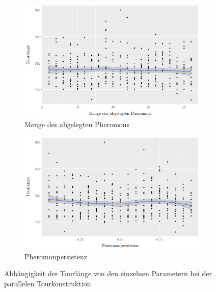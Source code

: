 \documentclass[doktyp=barbeit, sprache=german]{TUBAFarbeiten}
\begin{document}
\begin{figure}
\begin{subfigure}[b]{0.475\textwidth}
            \includegraphics[width=\textwidth]{images/diagramparalleldeposit}
            \caption{Menge des abgelegten Pheromons}   
            \label{fig:iterativeDeposit}
        \end{subfigure}
        \quad
        \begin{subfigure}[b]{0.475\textwidth}   
            \centering 
            \includegraphics[width=\textwidth]{images/diagramparallelreduction}
            \caption{Pheromonpersistenz}   
            \label{fig:iterativeReduction}
        \end{subfigure}
        \caption{Abhängigkeit der Tourlänge von den einzelnen Parametern bei der parallelen Tourkonstruktion } 
        \label{fig:parallelDiagram}
    \end{figure}
\end{document}
